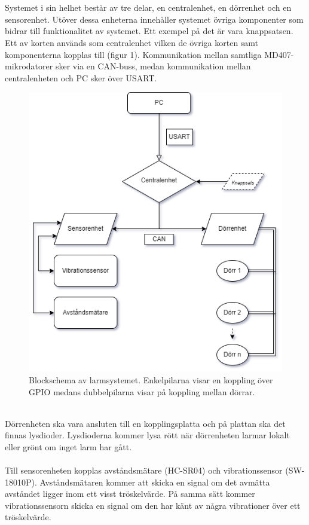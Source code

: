 \documentclass{article}
\begin{document}
\\
\\
\noindent
Systemet i sin helhet består av tre delar, en centralenhet, en dörrenhet och en sensorenhet. 
Utöver dessa enheterna innehåller systemet övriga komponenter som bidrar till funktionalitet av systemet. 
Ett exempel på det är vara knappsatsen.
Ett av korten används som centralenhet vilken de övriga korten samt komponenterna kopplas till (figur 1). 
Kommunikation mellan samtliga MD407-mikrodatorer sker via en CAN-buss, medan kommunikation mellan centralenheten och PC sker över USART.
\\
\begin{figure}[h]
    \centering
    \includegraphics[scale=0.6]{Projektrapport/diagram (1).png}
     \caption {Blockschema av larmsystemet. Enkelpilarna visar en koppling över GPIO medans dubbelpilarna visar på koppling mellan dörrar.}
    \label{fig:drawing}
\end{figure}
\newpage
\\
\noindent
Dörrenheten ska vara ansluten till en kopplingsplatta och på plattan ska det finnas lysdioder.
Lysdioderna kommer lysa rött när dörrenheten larmar lokalt eller grönt om inget larm har gått.
\\
\\
Till sensorenheten kopplas avståndsmätare (HC-SR04) och vibrationssensor (SW-18010P).
Avståndsmätaren kommer att skicka en signal om det avmätta avståndet ligger inom ett visst tröskelvärde.
På samma sätt kommer vibrationssensorn skicka en signal om den har känt av några vibrationer över ett tröskelvärde.
\end{document}
